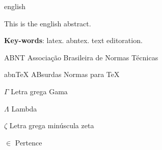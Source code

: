 \documentclass[
	12pt,				%
	openright,			%
	twoside,			%
	a4paper,			%
	english,			%
	brazil				%
	]{abntex2ufop} %
\begin{document}
\begin{resumo}[Abstract]
 \begin{otherlanguage*}{english}

\noindent This is the english abstract.

   \vspace{\onelineskip}
 
   \noindent 
   \textbf{Key-words}: latex. abntex. text editoration.
 \end{otherlanguage*}
\end{resumo}

% 
%
%  

\listoffigures*
\cleardoublepage

\listoftables*
\cleardoublepage

\begin{siglas}
  \item[ABNT] Associação Brasileira de Normas Técnicas
  \item[abnTeX] ABsurdas Normas para TeX
\end{siglas}

\begin{simbolos}
  \item[$ \Gamma $] Letra grega Gama
  \item[$ \Lambda $] Lambda
  \item[$ \zeta $] Letra grega minúscula zeta
  \item[$ \in $] Pertence
\end{simbolos}
\end{document}
